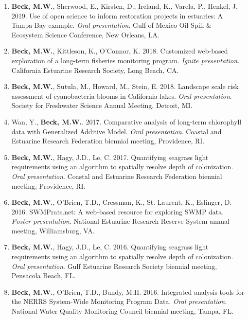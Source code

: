 \documentclass[letterpaper,12pt]{article}
\begin{document}
\begin{enumerate}
\item {\bf Beck, M.W.}, Sherwood, E., Kirsten, D., Ireland, K., Varela, P., Henkel, J. 2019. Use of open science to inform restoration projects in estuaries: A Tampa Bay example. \textit{Oral presentation}. Gulf of Mexico Oil Spill \& Ecosystem Science Conference, New Orleans, LA.

\item {\bf Beck, M.W.}, Kittleson, K., O'Connor, K. 2018. Customized web-based exploration of a long-term fisheries monitoring program. \textit{Ignite presentation}. California Estuarine Research Society, Long Beach, CA.

\item {\bf Beck, M.W.}, Sutula, M., Howard, M., Stein, E. 2018. Landscape scale risk assessment of cyanobacteria blooms in California lakes. \textit{Oral presentation}. Society for Freshwater Science Annual Meeting, Detroit, MI.

\item Wan, Y., {\bf Beck, M.W.}. 2017. Comparative analysis of long-term chlorophyll data with Generalized Additive Model. \textit{Oral presentation}. Coastal and Estuarine Research Federation biennial meeting, Providence, RI.

\item {\bf Beck, M.W.}, Hagy, J.D., Le, C. 2017. Quantifying seagrass light requirements using an algorithm to spatially resolve depth of colonization. \textit{Oral presentation}. Coastal and Estuarine Research Federation biennial meeting, Providence, RI.

\item {\bf Beck, M.W.}, O'Brien, T.D., Cressman, K., St. Laurent, K., Eslinger, D. 2016. SWMPrats.net: A web-based resource for exploring SWMP data. \textit{Poster presentation}. National Estuarine Research Reserve System annual meeting, Williamsburg, VA. 

\item {\bf Beck, M.W.}, Hagy, J.D., Le, C. 2016. Quantifying seagrass light requirements using an algorithm to spatially resolve depth of colonization. \textit{Oral presentation}. Gulf Estuarine Research Society biennial meeting, Pensacola Beach, FL.

\item {\bf Beck, M.W.}, O'Brien, T.D., Bundy, M.H. 2016. Integrated analysis tools for the NERRS System-Wide Monitoring Program Data. \textit{Oral presentation}. National Water Quality Monitoring Council biennial meeting, Tampa, FL.


\end{enumerate}
\end{document}
